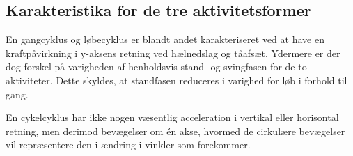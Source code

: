 

\subsection{Karakteristika for de tre aktivitetsformer}
En gangcyklus og løbecyklus er blandt andet karakteriseret ved at have en kraftpåvirkning i y-aksens retning ved hælnedslag og tåafsæt. Ydermere er der dog forskel på varigheden af henholdsvis stand- og svingfasen for de to aktiviteter. Dette skyldes, at standfasen reduceres i varighed for løb i forhold til gang. \newline

En cykelcyklus har ikke nogen væsentlig acceleration i vertikal eller horisontal retning, men derimod bevægelser om én akse, hvormed de cirkulære bevægelser vil repræsentere den i ændring i vinkler som forekommer. \citep{Cockcroft2011,Marin-PerianuMarin-Perianu2013}


